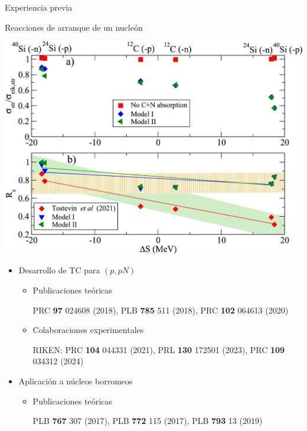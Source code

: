 \documentclass{beamer}
\begin{document}
\begin{frame}{Experiencia previa} 

   \begin{minipage}{0.45\textwidth}
    \tiny Reacciones de arranque de un nucleón 
   
    \includegraphics[height=0.3\textheight]{quenching.jpg}
    \end{minipage}
    \begin{minipage}{0.45\textwidth}
    \tiny
    \begin{itemize}
    \item Desarrollo de TC para $(p,pN)$
    \begin{itemize}
       \tiny
    \item Publicaciones teóricas
    
    PRC \textbf{97} 024608 (2018), PLB \textbf{785} 511 (2018), PRC \textbf{102} 064613 (2020)  
    
    \item Colaboraciones experimentales
    
    RIKEN: PRC \textbf{104} 044331 (2021), PRL \textbf{130} 172501 (2023), PRC \textbf{109} 034312 (2024)    
    
    \end{itemize}
    \item Aplicación a núcleos borromeos
    \begin{itemize}
    \tiny
    \item Publicaciones teóricas
    
    PLB \textbf{767} 307 (2017), PLB \textbf{772} 115 (2017), PLB \textbf{793} 13 (2019)    
    

\end{itemize}
\end{itemize}
\end{minipage}
\end{frame}
\end{document}
